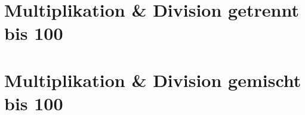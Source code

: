 \documentclass[version=last,paper=A4,fontsize=14pt,DIV=18]{scrartcl}
\begin{document}
	\section*{Multiplikation \& Division getrennt bis 100}
	
	
	
	
	\pagebreak
	
	\section*{Multiplikation \& Division gemischt bis 100}

	
	
\end{document}
